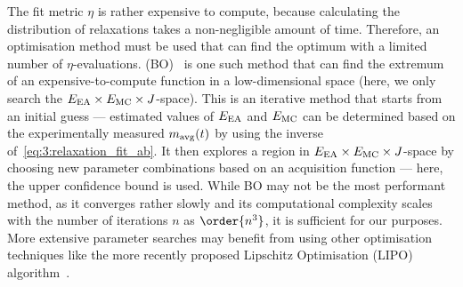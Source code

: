 The fit metric $\eta$ is rather expensive to compute, because calculating the distribution of relaxations takes a non-negligible amount of time.
Therefore, an optimisation method must be used that can find the optimum with a limited number of $\eta$-evaluations.
 (BO)~\cite{bayesopt_package,BayesOpt_Mockus1975} is one such method that can find the extremum of an expensive-to-compute function in a low-dimensional space (here, we only search the $E_\mathrm{EA} \times E_\mathrm{MC} \times J$-space).
This is an iterative method that starts from an initial guess --- estimated values of $E_\mathrm{EA}$ and $E_\mathrm{MC}$ can be determined based on the experimentally measured $m_\mathrm{avg}(t)$ by using the inverse of~\cref{eq:3:relaxation_fit_ab}.
It then explores a region in $E_\mathrm{EA} \times E_\mathrm{MC} \times J$-space by choosing new parameter combinations based on an acquisition function --- here, the upper confidence bound is used.
While BO may not be the most performant method, as it converges rather slowly and its computational complexity scales with the number of iterations $n$ as $\order{n^3}$, it is sufficient for our purposes.
More extensive parameter searches may benefit from using other optimisation techniques like the more recently proposed Lipschitz Optimisation (LIPO) algorithm~\cite{LIPO,LIPO_dlib}.

